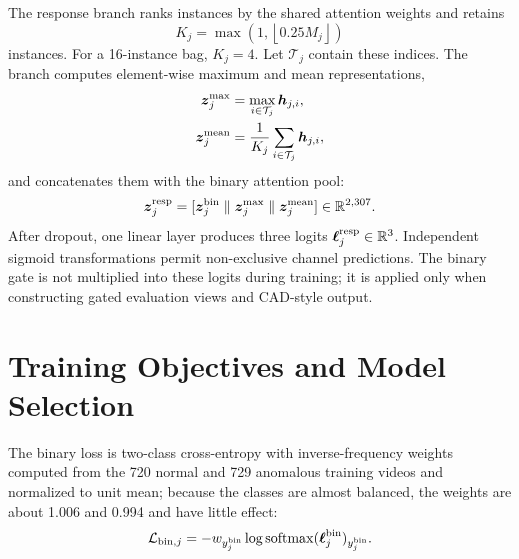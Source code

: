 The response branch ranks instances by the shared attention weights and retains
\begin{equation}
    K_j=\max\!\left(1,\left\lfloor0.25M_j\right\rfloor\right)
\end{equation}
instances. For a 16-instance bag, $K_j=4$. Let $\mathcal{T}_j$ contain these indices. The branch computes element-wise maximum and mean representations,
\begin{align}
    \boldsymbol{z}^{\max}_j&=\max_{i\in\mathcal{T}_j}\boldsymbol{h}_{j,i},\\
    \boldsymbol{z}^{\mathrm{mean}}_j&=\frac{1}{K_j}\sum_{i\in\mathcal{T}_j}\boldsymbol{h}_{j,i},
\end{align}
and concatenates them with the binary attention pool:
\begin{equation}
    \boldsymbol{z}^{\mathrm{resp}}_j
    =[\boldsymbol{z}^{\mathrm{bin}}_j\parallel
      \boldsymbol{z}^{\max}_j\parallel
      \boldsymbol{z}^{\mathrm{mean}}_j]
    \in\mathbb{R}^{2{,}307}.
\end{equation}
After dropout, one linear layer produces three logits $\boldsymbol{\ell}^{\mathrm{resp}}_j\in\mathbb{R}^{3}$. Independent sigmoid transformations permit non-exclusive channel predictions. The binary gate is not multiplied into these logits during training; it is applied only when constructing gated evaluation views and CAD-style output.

\section{Training Objectives and Model Selection}
\label{sec:optimization}

The binary loss is two-class cross-entropy with inverse-frequency weights computed from the 720 normal and 729 anomalous training videos and normalized to unit mean; because the classes are almost balanced, the weights are about 1.006 and 0.994 and have little effect:
\begin{equation}
    \mathcal{L}_{\mathrm{bin},j}
    =-w_{y_j^{\mathrm{bin}}}
      \log\operatorname{softmax}(\boldsymbol{\ell}^{\mathrm{bin}}_j)_{y_j^{\mathrm{bin}}}.
\end{equation}

